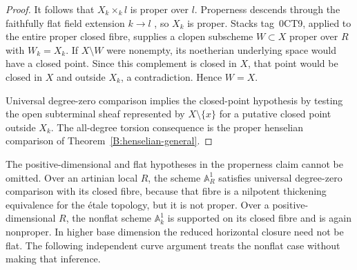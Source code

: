 \begin{proof}
It follows that $X_k\times_k l$ is proper over $l$. Properness
descends through the faithfully flat field extension $k\to l$
\cite[Tag 02L1]{BStacks}, so $X_k$ is proper. Stacks tag~0CT9,
applied to the entire proper closed fibre, supplies a clopen
subscheme $W\subset X$ proper over $R$ with $W_k=X_k$. If
$X\setminus W$ were nonempty, its noetherian underlying space
would have a closed point. Since this complement is closed in
$X$, that point would be closed in $X$ and outside $X_k$, a
contradiction. Hence $W=X$.

Universal degree-zero comparison implies the closed-point
hypothesis by testing the open subterminal sheaf represented by
$X\setminus\{x\}$ for a putative closed point outside $X_k$.
The all-degree torsion consequence is the proper henselian
comparison of Theorem~\ref{B:henselian-general}.
\end{proof}

The positive-dimensional and flat hypotheses in the properness
claim cannot be omitted. Over an artinian local $R$, the scheme
$\mathbb A^1_R$ satisfies universal degree-zero comparison with
its closed fibre, because that fibre is a nilpotent thickening
equivalence for the \'etale topology, but it is not proper. Over
a positive-dimensional $R$, the nonflat scheme $\mathbb A^1_k$
is supported on its closed fibre and is again nonproper. In
higher base dimension the reduced horizontal closure need not
be flat. The following independent curve argument treats the
nonflat case without making that inference.


